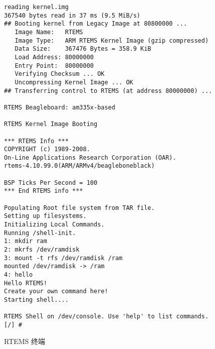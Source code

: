 \begin{figure}
\centering\fontsize{10}{10}\selectfont
\begin{boxedminipage}{.96\textwidth}
\begin{verbatim}
reading kernel.img                                                              
367540 bytes read in 37 ms (9.5 MiB/s)                                          
## Booting kernel from Legacy Image at 80800000 ...                             
   Image Name:   RTEMS                                                          
   Image Type:   ARM RTEMS Kernel Image (gzip compressed)                       
   Data Size:    367476 Bytes = 358.9 KiB                                       
   Load Address: 80000000                                                       
   Entry Point:  80000000                                                       
   Verifying Checksum ... OK                                                    
   Uncompressing Kernel Image ... OK                                            
## Transferring control to RTEMS (at address 80000000) ...                      

RTEMS Beagleboard: am335x-based                                                 

RTEMS Kernel Image Booting                                                      

*** RTEMS Info ***                                                              
COPYRIGHT (c) 1989-2008.                                                        
On-Line Applications Research Corporation (OAR).                                
rtems-4.10.99.0(ARM/ARMv4/beagleboneblack)                                      

BSP Ticks Per Second = 100                                                     
*** End RTEMS info ***                                                          

Populating Root file system from TAR file.                                      
Setting up filesystems.                                                         
Initializing Local Commands.                                                    
Running /shell-init.                                                            
1: mkdir ram                                                                    
2: mkrfs /dev/ramdisk                                                           
3: mount -t rfs /dev/ramdisk /ram                                               
mounted /dev/ramdisk -> /ram                                                    
4: hello                                                                        
Hello RTEMS!                                                                    
Create your own command here!                                                   
Starting shell....                                                              

RTEMS Shell on /dev/console. Use 'help' to list commands.                       
[/] # 
\end{verbatim}
\end{boxedminipage}
\caption{RTEMS 终端}
\end{figure}


